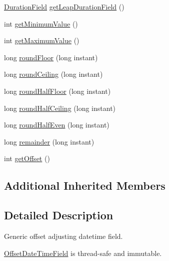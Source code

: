 \begin{DoxyCompactItemize}
\item 
\hyperlink{classorg_1_1joda_1_1time_1_1_duration_field}{Duration\-Field} \hyperlink{classorg_1_1joda_1_1time_1_1field_1_1_offset_date_time_field_a20127e7ef99417bc397497032257b498}{get\-Leap\-Duration\-Field} ()
\item 
int \hyperlink{classorg_1_1joda_1_1time_1_1field_1_1_offset_date_time_field_ac80f2868242a88800ef668c2267c9841}{get\-Minimum\-Value} ()
\item 
int \hyperlink{classorg_1_1joda_1_1time_1_1field_1_1_offset_date_time_field_af7f64a9904aea1fc1b46b7d575f2cba2}{get\-Maximum\-Value} ()
\item 
long \hyperlink{classorg_1_1joda_1_1time_1_1field_1_1_offset_date_time_field_af7e8fc6783ae94a1e11b9582a38160c9}{round\-Floor} (long instant)
\item 
long \hyperlink{classorg_1_1joda_1_1time_1_1field_1_1_offset_date_time_field_a38bb070c2c8ac6ed68f86f0c321339f9}{round\-Ceiling} (long instant)
\item 
long \hyperlink{classorg_1_1joda_1_1time_1_1field_1_1_offset_date_time_field_a91295baf5bcd59142c3af38c4827372e}{round\-Half\-Floor} (long instant)
\item 
long \hyperlink{classorg_1_1joda_1_1time_1_1field_1_1_offset_date_time_field_ad7a7aa983822705d9b735317390a0a86}{round\-Half\-Ceiling} (long instant)
\item 
long \hyperlink{classorg_1_1joda_1_1time_1_1field_1_1_offset_date_time_field_a7225ab6c33e683606f268ee9797db95d}{round\-Half\-Even} (long instant)
\item 
long \hyperlink{classorg_1_1joda_1_1time_1_1field_1_1_offset_date_time_field_ae6242400225be4030e40478338f55b17}{remainder} (long instant)
\item 
int \hyperlink{classorg_1_1joda_1_1time_1_1field_1_1_offset_date_time_field_a1f6d307ca4e56f888e1dd1472c484324}{get\-Offset} ()
\end{DoxyCompactItemize}
\subsection*{Additional Inherited Members}


\subsection{Detailed Description}
Generic offset adjusting datetime field. 

\hyperlink{classorg_1_1joda_1_1time_1_1field_1_1_offset_date_time_field}{Offset\-Date\-Time\-Field} is thread-\/safe and immutable.

